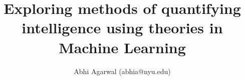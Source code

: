 \documentclass[11pt, oneside]{article}
\title{Exploring methods of quantifying intelligence using theories in Machine Learning}
\author{Abhi Agarwal (abhia@nyu.edu)}
\date{}
\begin{document}
\maketitle






\par 

\end{document}
